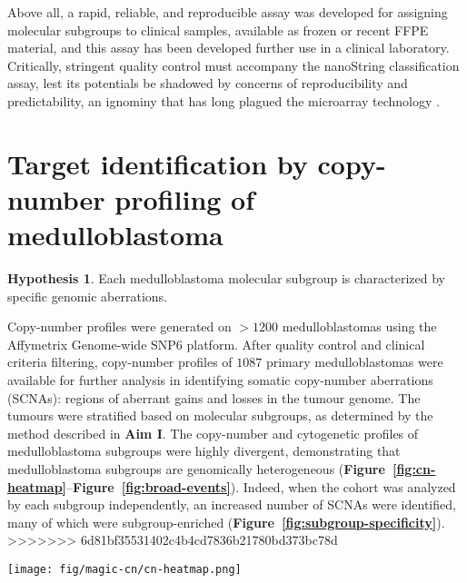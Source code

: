\documentclass[11pt,letterpaper]{article}
\theoremstyle{definition}
\newtheorem*{hypothesis}{Hypothesis}
\newcommand{\emphlab}[1]{\textbf{\textsf{#1}}}
\newcommand{\citefig}[1]{\emphlab{Figure~\ref{fig:#1}}}
\begin{document}
Above all, a rapid, reliable, and reproducible assay was developed for assigning molecular subgroups to clinical samples, available as frozen or recent FFPE material, and this assay has been developed further use in a clinical laboratory. Critically, stringent quality control must accompany the nanoString classification assay, lest its potentials be shadowed by concerns of reproducibility and predictability, an ignominy that has long plagued the microarray technology .


\clearpage


\section{Target identification by copy-number profiling of medulloblastoma}

\begin{hypothesis}
Each medulloblastoma molecular subgroup is characterized by specific genomic aberrations.
\end{hypothesis}

Copy-number profiles were generated on $> 1200$ medulloblastomas using the Affymetrix Genome-wide SNP6 platform. After quality control and clinical criteria filtering, copy-number profiles of $1087$ primary medulloblastomas were available for further analysis in identifying somatic copy-number aberrations (SCNAs): regions of aberrant gains and losses in the tumour genome. The tumours were stratified based on molecular subgroups, as determined by the method described in \textbf{Aim I}. The copy-number and cytogenetic profiles of medulloblastoma subgroups were highly divergent, demonstrating that medulloblastoma subgroups are genomically heterogeneous (\citefig{cn-heatmap}--\citefig{broad-events}). Indeed, when the cohort was analyzed by each subgroup independently, an increased number of SCNAs were identified, many of which were subgroup-enriched (\citefig{subgroup-specificity}).
>>>>>>> 6d81bf35531402c4b4cd7836b21780bd373bc78d

\begin{SCfigure}[5][t]
	\centering
	\texttt{[image: fig/magic-cn/cn-heatmap.png]}
	\caption[Genome-wide copy-number profile of medulloblastoma subgroups]
	{
	Genome-wide copy-number profile of medulloblastoma subgroups.
	Copy-number profiling was performed on 1087 non-overlapping primary medulloblastomas. Shown is a copy number heatmap for 827 cases classified according to medulloblastoma subgroup based on matched gene expression data.  Amplifications are shown in red and deletions in blue.
	}
	\label{fig:cn-heatmap}
\end{SCfigure}
\end{document}
